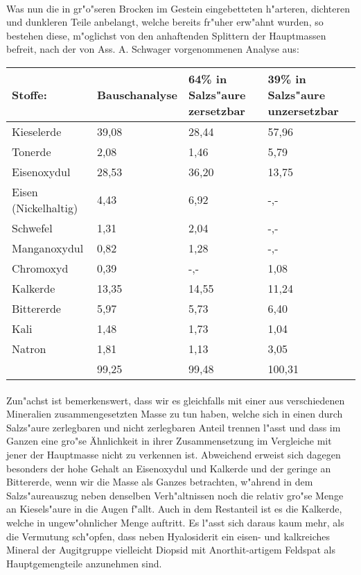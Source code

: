 \documentclass[a4paper, 11pt, oneside]{article}
\begin{document}
\paragraph{}
Was nun die in gr"o"seren Brocken im Gestein eingebetteten h"arteren, dichteren und dunkleren Teile anbelangt, welche bereits fr"uher erw"ahnt wurden, so bestehen diese, m"oglichst von den anhaftenden Splittern der Hauptmassen befreit, nach der von Ass. A. Schwager vorgenommenen Analyse aus:
\begin{center}
    \begin{tabular}{ |p{32mm}|p{22mm}|p{20mm}|p{20mm}| }
    \hline
    Stoffe: & Bauschanalyse & 64\% in Salzs"aure zersetzbar & 39\% in Salzs"aure unzersetzbar\\
    \hline\hline
    Kieselerde & 39,08 & 28,44 & 57,96\\\hline
    Tonerde & 2,08 & 1,46 & 5,79\\\hline
    Eisenoxydul & 28,53 & 36,20 & 13,75\\\hline
    Eisen (Nickelhaltig) & 4,43 & 6,92 & -,-\\\hline
    Schwefel & 1,31 & 2,04 & -,-\\\hline
    Manganoxydul & 0,82 & 1,28 & -,-\\\hline
    Chromoxyd & 0,39 & -,- & 1,08\\\hline
    Kalkerde & 13,35 & 14,55 & 11,24\\\hline
    Bittererde & 5,97 & 5,73 & 6,40\\\hline
    Kali & 1,48 & 1,73 & 1,04\\\hline
    Natron & 1,81 & 1,13 & 3,05\\\hline
    & 99,25 & 99,48 & 100,31\\
    \hline
    \end{tabular}
\end{center}
\paragraph{}
Zun"achst ist bemerkenswert, dass wir es gleichfalls mit einer aus verschiedenen Mineralien zusammengesetzten Masse zu tun haben, welche sich in einen durch Salzs"aure zerlegbaren und nicht zerlegbaren Anteil trennen l"asst und dass im Ganzen eine gro"se Ähnlichkeit in ihrer Zusammensetzung im Vergleiche mit jener der Hauptmasse nicht zu verkennen ist. Abweichend erweist sich dagegen besonders der hohe Gehalt an Eisenoxydul und Kalkerde und der geringe an Bittererde, wenn wir die Masse als Ganzes betrachten, w"ahrend in dem Salzs"aureauszug neben denselben Verh"altnissen noch die relativ gro"se Menge an Kiesels"aure in die Augen f"allt. Auch in dem Restanteil ist es die Kalkerde, welche in ungew"ohnlicher Menge auftritt. Es l"asst sich daraus kaum mehr, als die Vermutung sch"opfen, dass neben Hyalosiderit ein eisen- und kalkreiches Mineral der Augitgruppe vielleicht Diopsid mit Anorthit-artigem Feldspat als Hauptgemengteile anzunehmen sind.
\end{document}
